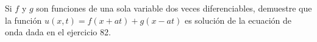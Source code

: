 \item Si $f$ y $g$ son funciones de una sola variable dos veces diferenciables, demuestre que la función $u(x, t) = f(x+at) + g(x-at)$ es solución de la ecuación de onda dada en el ejercicio 82.

